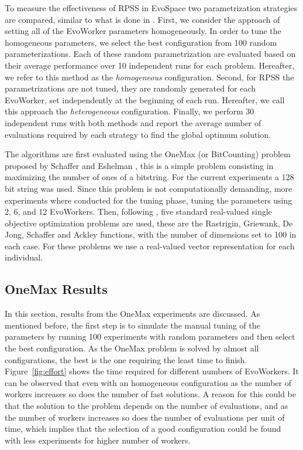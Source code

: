 \documentclass{llncs}
\begin{document}
To measure the effectiveness of RPSS in EvoSpace two parametrization strategies are compared, 
similar to what is done in \cite{fuku1,fuku2,garcia2014randomized}. First, we consider the approach of setting all 
of the EvoWorker parameters homogeneously. In order to tune the homogeneous parameters,
we select the best configuration from 100 random parameterizations. 
Each of these random parametrization are evaluated based on their average performance over 10 
independent runs for each problem.
Hereafter, we refer to this method as the {\em homogeneous} configuration. Second, for RPSS the parametrizations
are not tuned, they are randomly generated for each EvoWorker, set independently at the beginning of each run.
Hereafter, we call this approach the {\em heterogeneous} configuration. Finally, we perform 30 independent runs
with both methods and report the average number of evaluations required by each strategy to find the
global optimum solution.

The algorithms are first evaluated using the OneMax (or BitCounting) problem proposed by 
Schaffer and Eshelman \cite{SE91}, this is a simple problem consisting in maximizing the number 
of ones of a bitstring. For the current experiments a 128 bit string was used. Since this
problem is not computationally demanding, more experiments where conducted for the tuning phase, 
tuning the parameters using 2, 6, and 12 EvoWorkers. Then, following \cite{fuku1}, 
five standard real-valued single objective optimization problems 
are used, these are the Rastrigin, Griewank, De Jong, Schaffer  and Ackley functions, 
with the number of dimensions set to 100 in each case. For these problems we use a real-valued vector
representation for each individual.


\subsection{OneMax Results}

In this section, results from the OneMax experiments are discussed. As mentioned before, the first
step is to simulate the manual tuning of the parameters by running 100 experiments with random 
parameters and then select the best configuration. As the OneMax problem is solved by almost 
all configurations, the best is the one requiring the least time to finish. Figure~\ref{fig:effort} 
shows the time required for different numbers of EvoWorkers. It can be observed that even with an 
homogeneous configuration as the number of workers increases so does
the number of fast solutions.
A reason for this could be that the solution to the problem depends on the number of evaluations, and 
as the number of workers increases so does the number of evaluations
per unit of time, which implies
that the selection of a good configuration could be found with less experiments for higher number 
of workers.
\end{document}
